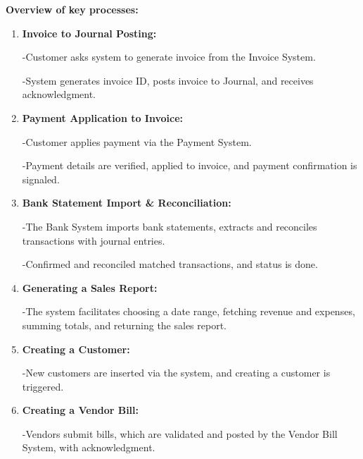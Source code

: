\documentclass[11pt,a4paper]{article}
\begin{document}
\noindent\textbf{Overview of key processes:}
\begin{enumerate}
    \item \textbf{Invoice to Journal Posting:}
    
    -Customer asks system to generate invoice from the Invoice System.

	-System generates invoice ID, posts invoice to Journal, and receives acknowledgment.

    \item \textbf{Payment Application to Invoice:}
    
    -Customer applies payment via the Payment System.

	-Payment details are verified, applied to invoice, and payment confirmation is signaled.

    \item \textbf{Bank Statement Import \& Reconciliation:}
    
    -The Bank System imports bank statements, extracts and reconciles transactions with journal entries.

	-Confirmed and reconciled matched transactions, and status is done.

    \item \textbf{Generating a Sales Report:}
    
    -The system facilitates choosing a date range, fetching revenue and expenses, summing totals, and returning the sales report.

    \item \textbf{Creating a Customer:}
    
    -New customers are inserted via the system, and creating a customer is triggered.

    \item \textbf{Creating a Vendor Bill:}
    
    -Vendors submit bills, which are validated and posted by the Vendor Bill System, with acknowledgment.

\end{enumerate}
\end{document}
